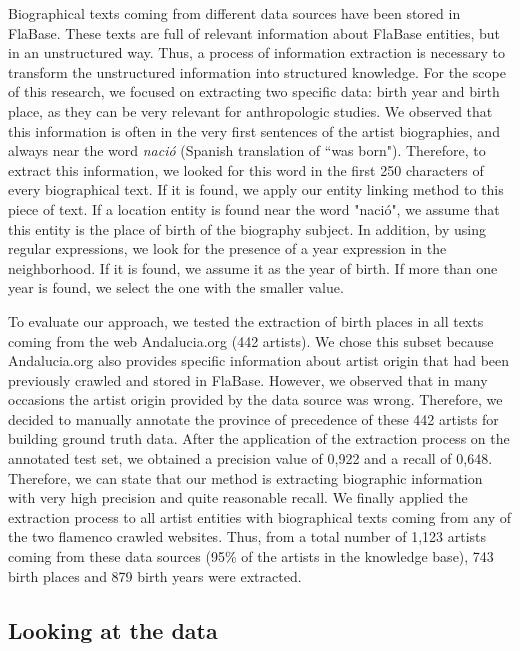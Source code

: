 Biographical texts coming from different data sources have been stored in FlaBase. These texts are full of relevant information about FlaBase entities, but in an unstructured way. Thus, a process of information extraction is necessary to transform the unstructured information into structured knowledge. For the scope of this research, we focused on extracting two specific data: birth year and birth place, as they can be very relevant for anthropologic studies. We observed that this information is often in the very first sentences of the artist biographies, and always near the word \textit{naci\'{o}} (Spanish translation of ``was born"). Therefore, to extract this information, we looked for this word in the first 250 characters of every biographical text. If it is found, we apply our entity linking method to this piece of text. If a location entity is found near the word "naci\'{o}", we assume that this entity is the place of birth of the biography subject. In addition, by using regular expressions, we look for the presence of a year expression in the neighborhood. If it is found, we assume it as the year of birth. If more than one year is found, we select the one with the smaller value. 

To evaluate our approach, we tested the extraction of birth places in all texts coming from the web Andalucia.org (442 artists). We chose this subset because Andalucia.org also provides specific information about artist origin that had been previously crawled and stored in FlaBase. However, we observed that in many occasions the artist origin provided by the data source was wrong. Therefore, we decided to manually annotate the province of precedence of these 442 artists for building ground truth data. After the application of the extraction process on the annotated test set, we obtained a precision value of 0,922 and a recall of 0,648. Therefore, we can state that our method is extracting biographic information with very high precision and quite reasonable recall. 
We finally applied the extraction process to all artist entities with biographical texts coming from any of the two flamenco crawled websites. Thus, from a total number of 1,123 artists coming from these data sources (95\% of the artists in the knowledge base), 743 birth places and 879 birth years were extracted. 

\subsection{Looking at the data}

